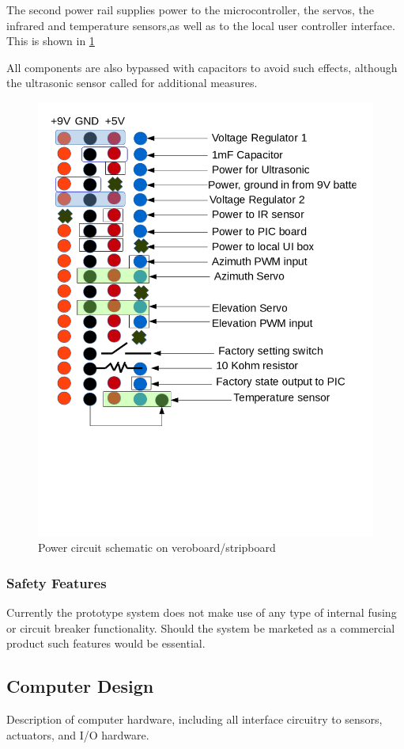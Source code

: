 \documentclass[]{report}
\begin{document}
The second power rail supplies power to the microcontroller, the servos, the infrared and temperature sensors,as well as to the local user controller interface. This is shown in \ref{fig:PowerBusDiagram}

All components are also bypassed with capacitors to avoid such effects, although the ultrasonic sensor called for additional measures.

\label{PowerBusDiagram}

\begin{figure}
\centering
\includegraphics[width=0.7\linewidth]{"../Diagrams/PowerCircuit"}
\caption[State Diagram]{Power circuit schematic on veroboard/stripboard}
\label{fig:PowerBusDiagram}
\end{figure}

\subsubsection{Safety Features}
Currently the prototype system does not make use of any type of internal fusing or circuit breaker functionality. Should the system be marketed as a commercial product such features would be essential.

\subsection{Computer Design}
Description of computer hardware, including all interface circuitry to sensors, actuators, and I/O hardware.
\end{document}
